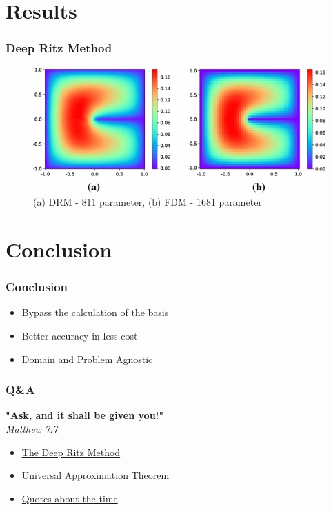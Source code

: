 \documentclass{beamer}
\begin{document}
\section{Results}

\begin{frame}
	\frametitle{Deep Ritz Method}
	\begin{figure}
		\caption{(a) DRM - 811 parameter, (b) FDM - 1681 parameter}
		\includegraphics[width=\textwidth,height=\textheight,keepaspectratio]{DRMvsFDM.png}

	\end{figure}
\end{frame}


\section{Conclusion}
\begin{frame}
	\frametitle{Conclusion}
	\begin{itemize}
		\item <1- > Bypass the calculation of the basis
		\item <2- > Better accuracy in less cost
		\item <3- > Domain and Problem Agnostic
	\end{itemize}
\end{frame}

\begin{frame}
  \frametitle{Q\&A}
\textbf{"Ask, and it shall be given you!"}\centering\\
\em Matthew 7:7
\end{frame}
\begin{frame}
	\begin{itemize}
		\item \href{https://arxiv.org/pdf/1710.00211.pdf}{The Deep Ritz Method}
		\item \href{https://en.wikipedia.org/wiki/Universal_approximation_theorem}{Universal Approximation Theorem}
		\item \href{https://www.actitime.com/time-management/best-time-quotes/}{Quotes about the time}	
\end{itemize}
\end{frame}
\end{document}

